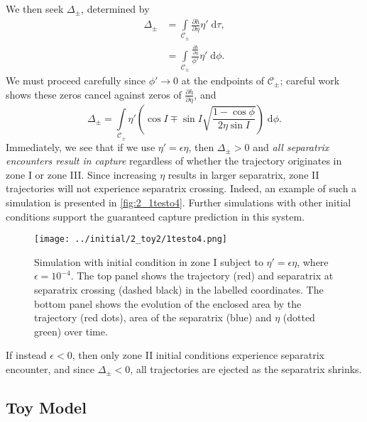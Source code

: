 \documentclass[
        fleqn,
        usenatbib,
    ]{mnras}
\newcommand*{\pd}[2]{\frac{\partial#1}{\partial#2}}
\newcommand*{\p}[1]{\left(#1\right)}
\begin{document}
We then seek $\Delta_{\pm}$, determined by
\begin{align}
    \Delta_{\pm} &= \int\limits_{\mathcal{C}_{\pm}}
            \pd{h}{\eta}\eta'\;\mathrm{d}\tau,\nonumber\\
        &= \int\limits_{\mathcal{C}_{\pm}}
            \frac{\pd{h}{\eta}}{\phi'}\eta'\;\mathrm{d}\phi.
\end{align}
We must proceed carefully since $\phi' \to 0$ at the endpoints of
$\mathcal{C}_{\pm}$; careful work shows these zeros cancel against zeros of
$\pd{h}{\eta}$, and
\begin{equation}
    \Delta_{\pm} = \int\limits_{\mathcal{C}_{\pm}} \eta'
        \p{\cos I \mp \sin I \sqrt{\frac{1 - \cos \phi}{2\eta\sin I}}}
            \;\mathrm{d}\phi.\label{eq:p2_delta}
\end{equation}
Immediately, we see that if we use $\eta' = \epsilon \eta$, then $\Delta_{\pm} >
0$ and \emph{all separatrix encounters result in capture} regardless of whether
the trajectory originates in zone I or zone III\@. Since increasing $\eta$
results in larger separatrix, zone II trajectories will not experience
separatrix crossing. Indeed, an example of such a simulation is presented in
\autoref{fig:2_1testo4}. Further simulations with other initial conditions
support the guaranteed capture prediction in this system.
\begin{figure}[t]
    \centering
    \texttt{[image: ../initial/2\_toy2/1testo4.png]}
    \caption{Simulation with initial condition in zone I subject to $\eta' =
    \epsilon \eta$, where $\epsilon = 10^{-4}$. The top panel shows the
    trajectory (red) and separatrix at separatrix crossing (dashed black) in
    the labelled coordinates. The bottom panel shows the evolution of the
    enclosed area by the trajectory (red dots), area of the separatrix (blue)
    and $\eta$ (dotted green) over time.}\label{fig:2_1testo4}
\end{figure}

If instead $\epsilon < 0$, then only zone II initial conditions experience
separatrix encounter, and since $\Delta_{\pm} < 0$, all trajectories are
ejected as the separatrix shrinks.

\subsection{Toy Model}
\end{document}
